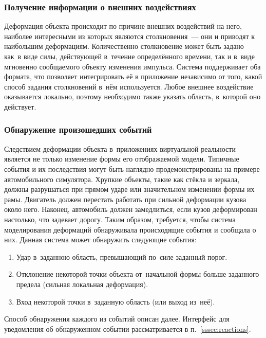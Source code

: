 \documentclass[a4paper, 14pt, titlepage]{extarticle}
\begin{document}
      \subsubsection{Получение информации о внешних воздействиях}\label{sssec:external_forces}

        Деформация объекта происходит по причине внешних воздействий на него, наиболее интересными
        из которых являются столкновения~--- они и приводят к наибольшим деформациям. Количественно
        столкновение может быть задано как~в виде силы, действующей в~течение определённого времени, так и
        в~виде мгновенно сообщаемого объекту изменения импульса.
        Система поддерживает оба формата, что позволяет интегрировать её в приложение независимо от
        того, какой способ задания столкновений в~нём используется.
        Любое внешнее воздействие оказывается локально, поэтому необходимо также указать область,
        в~которой оно действует.

      \subsubsection{Обнаружение произошедших событий}\label{sssec:events}

        Следствием деформации объекта в~приложениях виртуальной реальности является не только
        изменение формы его отображаемой модели. Типичные события и их последствия могут быть
        наглядно продемонстрированы на примере автомобильного симулятора. Хрупкие объекты, такие как
        стёкла и зеркала, должны разрушаться при прямом ударе или значительном изменении формы их
        рамы. Двигатель должен перестать работать при сильной деформации кузова около него.
        Наконец, автомобиль должен замедлиться, если кузов деформирован настолько, что задевает
        дорогу. Таким образом, требуется, чтобы система моделирования деформаций обнаруживала
        происходящие события и сообщала о них. Данная система может обнаружить следующие события:
        \begin{enumerate}
          \item Удар в~заданною область, превышающий по~силе заданный порог.
          \item Отклонение некоторой точки объекта от~начальной формы больше заданного предела
          (сильная локальная деформация).
          \item Вход некоторой точки в~заданную область (или выход из~неё).
        \end{enumerate}
        Способ обнаружения каждого из событий описан далее. Интерфейс для уведомления об
        обнаруженном событии рассматривается в п.~\ref{sssec:reactions}.
\end{document}
